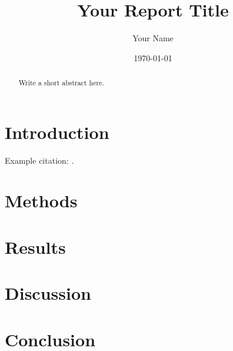 \documentclass[11pt]{article}
\title{Your Report Title}
\author{Your Name}
\date{\today}
\begin{document}
\maketitle

\begin{abstract}
Write a short abstract here.
\end{abstract}

\tableofcontents
\newpage

\section{Introduction}
Example citation: \cite{example2026}.

\section{Methods}

\section{Results}

\section{Discussion}

\section{Conclusion}



\end{document}
